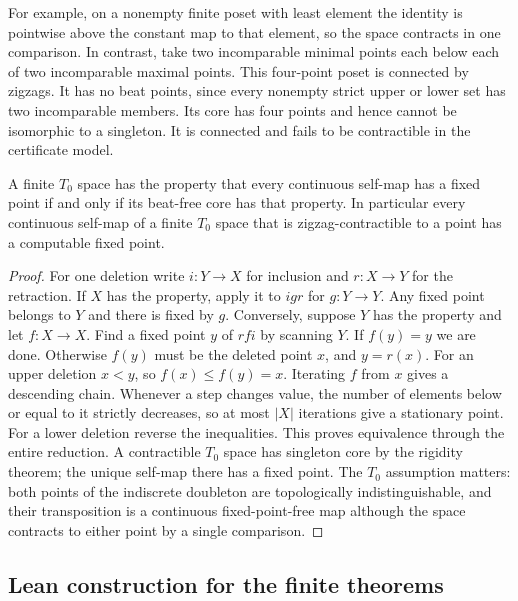For example, on a nonempty finite poset with least element the identity is
pointwise above the constant map to that element, so the space contracts in
one comparison. In contrast, take two incomparable minimal points each below
each of two incomparable maximal points. This four-point poset is connected
by zigzags. It has no beat points, since every nonempty strict upper or
lower set has two incomparable members. Its core has four points and
hence cannot be isomorphic to a singleton. It is connected and fails to
be contractible in the certificate model.

\begin{corollary}\label{idx-finite512}
A finite $T_0$ space has the property that every continuous self-map has a
fixed point if and only if its beat-free core has that property. In
particular every continuous self-map of a finite $T_0$ space that is
zigzag-contractible to a point has a computable fixed point.
\end{corollary}
\begin{proof}
For one deletion write $i:Y\to X$ for inclusion and $r:X\to Y$ for the
retraction. If $X$ has the property, apply it to $igr$ for $g:Y\to Y$.
Any fixed point belongs to $Y$ and there is fixed by $g$. Conversely,
suppose $Y$ has the property and let $f:X\to X$. Find a fixed point $y$
of $rfi$ by scanning $Y$. If $f(y)=y$ we are done. Otherwise $f(y)$
must be the deleted point $x$, and $y=r(x)$. For an upper deletion
$x<y$, so $f(x)\le f(y)=x$. Iterating $f$ from $x$ gives a descending
chain. Whenever a step changes value, the number of elements below or
equal to it strictly decreases, so at most $|X|$ iterations give a
stationary point. For a lower deletion reverse the inequalities.
This proves equivalence through the entire reduction. A contractible
$T_0$ space has singleton core by the rigidity theorem; the unique
self-map there has a fixed point. The $T_0$ assumption matters: both
points of the indiscrete doubleton are topologically indistinguishable,
and their transposition is a continuous fixed-point-free map although
the space contracts to either point by a single comparison.
\end{proof}

\subsection{Lean construction for the finite theorems}

